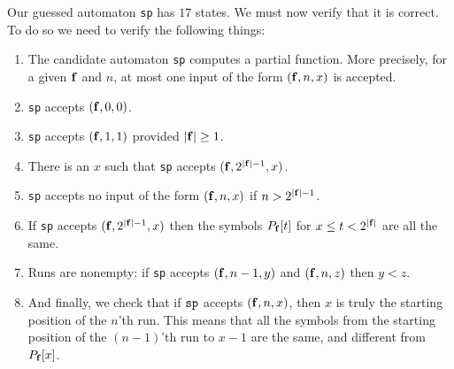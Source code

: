 \documentclass[12pt,reqno]{article}
\begin{document}
Our guessed automaton {\tt sp} has $17$ states.  We must
now verify that it is correct.  To do so we need to verify the following
things:
\begin{enumerate}
\item The candidate automaton {\tt sp} computes
 a partial function.  More precisely, for a given $\bf f$ and $n$, at most one
 input of the form $({\bf f},n,x)$ is accepted.
\item {\tt sp} accepts $({\bf f},0,0)$.
\item {\tt sp} accepts $({\bf f},1,1)$ provided $|{\bf f}| \geq 1$.
\item There is an $x$ such that {\tt sp} accepts $({\bf f},2^{|{\bf f}|-1},x)$.
\item {\tt sp} accepts no input of the form
$({\bf f},n,x)$ if $n > 2^{|{\bf f}|-1}$.
\item If {\tt sp} accepts $({\bf f},2^{|{\bf f}|-1},x)$ then
the symbols $P_{\bf f}[t]$ for $x \leq t < 2^{|{\bf f}|}$ are all the same.
\item Runs are nonempty: 
if {\tt sp} accepts $({\bf f},n-1,y)$ and $({\bf f},n,z)$ then $y<z$.
\item And finally, we check that if ${\tt sp}$ accepts
$({\bf f},n,x)$, then $x$ is truly the starting position of
the $n$'th run.  This means that all the symbols from the
starting position of the $(n-1)$'th run to $x-1$ are the
same, and different from $P_{\bf f}[x]$.
\end{enumerate}
\end{document}
